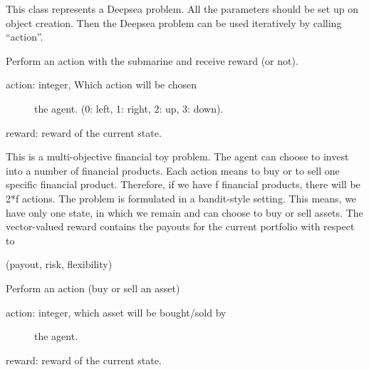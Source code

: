 \documentclass[letterpaper,10pt,english]{sphinxmanual}
\begin{document}
\begin{fulllineitems}
\label{Problems:morl_problems.Deepsea}
This class represents a Deepsea problem.
All the parameters should be set up on object
creation. Then the Deepsea problem can be used
iteratively by calling ``action''.

\begin{fulllineitems}
\label{Problems:morl_problems.Deepsea.play}
Perform an action with the submarine
and receive reward (or not).
\begin{description}
\item[{action: integer, Which action will be chosen}] \leavevmode
the agent. (0: left, 1: right, 2: up, 3: down).

\end{description}

reward: reward of the current state.

\end{fulllineitems}


\end{fulllineitems}


\begin{fulllineitems}
\label{Problems:morl_problems.Financial}
This is a multi-objective financial toy problem.
The agent can choose to invest into a number of financial products. Each action means to buy
or to sell one specific financial product. Therefore, if we have f financial products, there
will be 2*f actions. The problem is formulated in a bandit-style setting. This means, we have
only one state, in which we remain and can choose to buy or sell assets. The vector-valued
reward contains the payouts for the current portfolio with respect to

(payout, risk, flexibility)

\begin{fulllineitems}
\label{Problems:morl_problems.Financial.play}
Perform an action (buy or sell an asset)
\begin{description}
\item[{action: integer, which asset will be bought/sold by}] \leavevmode
the agent.

\end{description}

reward: reward of the current state.

\end{fulllineitems}


\end{fulllineitems}
\end{document}
